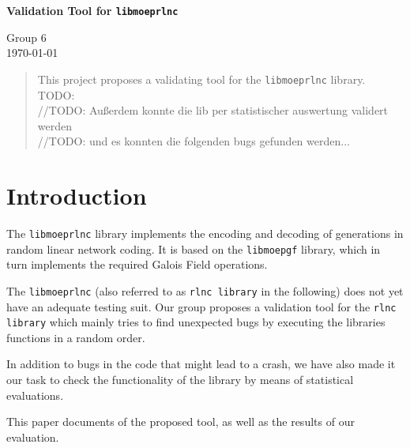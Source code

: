 \documentclass[a4paper,english,10pt]{tumarticle}
\begin{document}
\begin{center}
	\bfseries\Large Validation Tool for \texttt{libmoeprlnc}\\[.5\baselineskip]
\end{center}
\begin{center}
	\small Group 6\\
	\today
\end{center}


\setcounter{tocdepth}{1}
\renewcommand{\contentsname}{Anlagen}

\renewcommand{\emph}[1]{%
	\textcolor{TUMBlue}{#1}%
}


\renewcommand{\abstractname}{Abstract}
\begin{abstract}
\setlength{\parindent}{0pt}
\noindent%
\footnotesize

This project proposes a validating tool for the \texttt{libmoeprlnc} library. 
\\TODO:\\
//TODO: Außerdem konnte die lib per statistischer auswertung validert werden\\
//TODO: und es konnten die folgenden bugs gefunden werden...

\end{abstract}

\section{Introduction}

The \texttt{libmoeprlnc} library implements the encoding and decoding of generations in
random linear network coding. It is based on the \texttt{libmoepgf} library, which in turn
implements the required Galois Field operations.

The \texttt{libmoeprlnc} (also referred to as \texttt{rlnc library} in the following) does not yet have an 
adequate testing suit. Our group proposes a validation tool for the \texttt{rlnc library} which mainly tries to 
find unexpected bugs by executing the libraries functions in a random order.

In addition to bugs in the code that might lead to a crash, we have also made it our task to check the functionality 
of the library by means of statistical evaluations.

This paper documents of the proposed tool, as well as the results of our evaluation.
\end{document}
